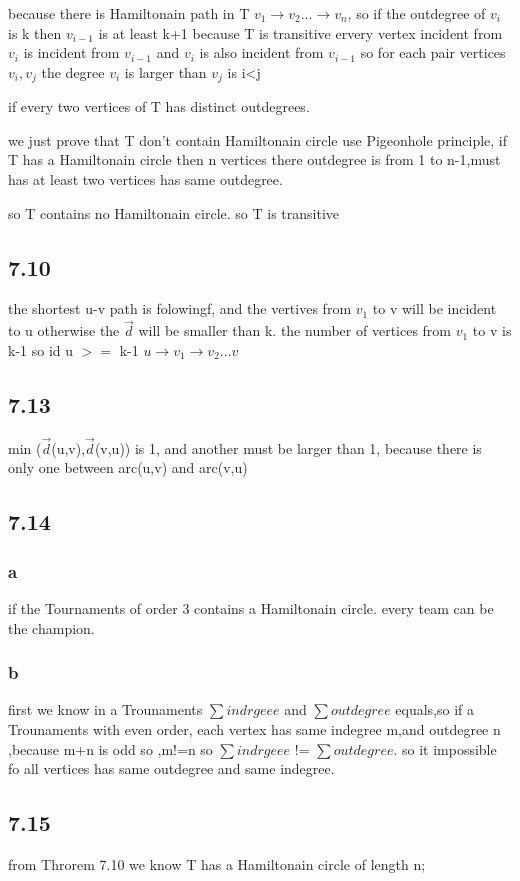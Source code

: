 \documentclass[a4paper,UTF8]{article}
\theoremstyle{definition}
\begin{document}
because there is Hamiltonain path in T $v_1 \to v_2 ... \to v_n $, so if the outdegree of $v_i$ is k then $v_{i-1}$ is at least k+1
because  T is transitive ervery vertex incident from $v_i$ is incident from $v_{i-1}$ and $v_i$ is also incident from $v_{i-1}$
so for each pair vertices $v_i,v_j$ the degree $v_i$ is larger than $v_j$ is i<j

if every two vertices of T has distinct outdegrees.

we just prove that T don't contain Hamiltonain circle use Pigeonhole principle, if T has a Hamiltonain circle then n vertices there outdegree is from 1 to n-1,must has at least two vertices has same outdegree.

so T contains no Hamiltonain circle. so T is transitive


\subsection*{7.10}
the shortest u-v path is folowingf, and the vertives from $v_1$ to v will be incident to u
otherwise the $\vec d$ will be smaller than k. the number of vertices from $v_1$ to v is k-1
so id u $>=$ k-1
$u \to v_1 \to v_2 ... v$

\subsection*{7.13}
min ($\vec d$(u,v),$\vec d$(v,u))
 is 1, and another must be larger than 1, because there is only one between arc(u,v) and arc(v,u)

\subsection*{7.14}

\subsubsection*{a}
if the Tournaments of order 3 contains a Hamiltonain circle. every team can be the champion.
\subsubsection*{b}
first we know in a Trounaments $\sum indrgeee$ and $\sum outdegree$ equals,so if a Trounaments with even order, each vertex has same indegree m,and outdegree n
,because m+n is odd so ,m!=n so  $\sum indrgeee$ != $\sum outdegree$. so it impossible fo all  vertices has same outdegree and same indegree.
\subsection*{7.15}
from Throrem 7.10 we know T has a Hamiltonain circle of length n;
\end{document}
